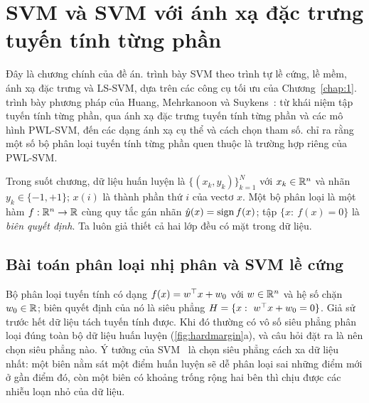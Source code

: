 \chapter{SVM và SVM với ánh xạ đặc trưng tuyến tính từng phần}\label{chap:2}

Đây là chương chính của đề án.  trình bày SVM theo trình tự lề cứng, lề mềm, ánh xạ đặc trưng và LS-SVM, dựa trên các công cụ tối ưu của Chương~\ref{chap:1}.  trình bày phương pháp của Huang, Mehrkanoon và Suykens~\cite{huang2013}: từ khái niệm tập tuyến tính từng phần, qua ánh xạ đặc trưng tuyến tính từng phần và các mô hình PWL-SVM, đến các dạng ánh xạ cụ thể và cách chọn tham số.  chỉ ra rằng một số bộ phân loại tuyến tính từng phần quen thuộc là trường hợp riêng của PWL-SVM.

Trong suốt chương, dữ liệu huấn luyện là $\{(x_k,y_k)\}_{k=1}^{N}$ với $x_k\in\mathbb{R}^n$ và nhãn $y_k\in\{-1,+1\}$; $x(i)$ là thành phần thứ $i$ của vectơ $x$. Một bộ phân loại là một hàm $f:\mathbb{R}^n\to\mathbb{R}$ cùng quy tắc gán nhãn $\hat y(x)=\operatorname{sign} f(x)$; tập $\{x:\ f(x)=0\}$ là \emph{biên quyết định}. Ta luôn giả thiết cả hai lớp đều có mặt trong dữ liệu.

\section{Bài toán phân loại nhị phân và SVM lề cứng}\label{sec:hardmargin}

Bộ phân loại tuyến tính có dạng $f(x)=w^\top x+w_0$ với $w\in\mathbb{R}^n$ và hệ số chặn $w_0\in\mathbb{R}$; biên quyết định của nó là siêu phẳng $H=\{x:\ w^\top x+w_0=0\}$. Giả sử trước hết dữ liệu tách tuyến tính được. Khi đó thường có vô số siêu phẳng phân loại đúng toàn bộ dữ liệu huấn luyện (\cref{fig:hardmargin}a), và câu hỏi đặt ra là nên chọn siêu phẳng nào. Ý tưởng của SVM~\cite{cortes1995,vapnik1998} là chọn siêu phẳng cách xa dữ liệu nhất: một biên nằm sát một điểm huấn luyện sẽ dễ phân loại sai những điểm mới ở gần điểm đó, còn một biên có khoảng trống rộng hai bên thì chịu được các nhiễu loạn nhỏ của dữ liệu.

